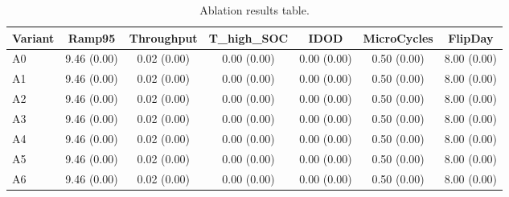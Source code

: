 \begin{table}[t]
\centering
\caption{Ablation results table.}
\label{tab:ablation_auto}
\begin{tabular}{lcccccc}
\toprule
Variant & Ramp95 & Throughput & T\_high\_SOC & IDOD & MicroCycles & FlipDay \\
\midrule
A0 & 9.46 (0.00) & 0.02 (0.00) & 0.00 (0.00) & 0.00 (0.00) & 0.50 (0.00) & 8.00 (0.00) \\
A1 & 9.46 (0.00) & 0.02 (0.00) & 0.00 (0.00) & 0.00 (0.00) & 0.50 (0.00) & 8.00 (0.00) \\
A2 & 9.46 (0.00) & 0.02 (0.00) & 0.00 (0.00) & 0.00 (0.00) & 0.50 (0.00) & 8.00 (0.00) \\
A3 & 9.46 (0.00) & 0.02 (0.00) & 0.00 (0.00) & 0.00 (0.00) & 0.50 (0.00) & 8.00 (0.00) \\
A4 & 9.46 (0.00) & 0.02 (0.00) & 0.00 (0.00) & 0.00 (0.00) & 0.50 (0.00) & 8.00 (0.00) \\
A5 & 9.46 (0.00) & 0.02 (0.00) & 0.00 (0.00) & 0.00 (0.00) & 0.50 (0.00) & 8.00 (0.00) \\
A6 & 9.46 (0.00) & 0.02 (0.00) & 0.00 (0.00) & 0.00 (0.00) & 0.50 (0.00) & 8.00 (0.00) \\
\bottomrule
\end{tabular}
\end{table}